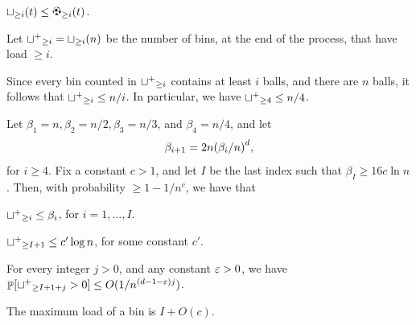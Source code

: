 \begin{observation}
    $\binsY{i}{t} \leq \ballsY{i}{t}$.
\end{observation}

\newcommand{\BadEvent}{\mathcal{B}}%
\newcommand{\GoodEvent}{\mathcal{G}}%


Let $\BLX{i} = \binsY{i}{n}$ be the number of bins, at the end of the
process, that have load $\geq i$.

\begin{observation}
    Since every bin counted in ${{\sqcup^+{}}_{\geq i}}$ contains at least $i$ balls,
    and there are $n$ balls, it follows that ${{\sqcup^+{}}_{\geq i}} \leq n/i$.  In
    particular, we have ${{\sqcup^+{}}_{\geq 4}} \leq n/4$.
\end{observation}


\begin{lemma}
    Let $\beta_1 = n, \beta_2 = n/2, \beta_3=n/3$, and
    $\beta_4 = n/4$, and let
    \begin{equation*}
        \beta_{i+1} = 2 n \pth{\beta_i/n}^d,
    \end{equation*}
    for $i\geq 4$.  Fix a constant $c > 1$, and let $I$ be the last index
    such that $\beta_{I} \geq 16c\ln n$. Then, with probability
    $\geq 1-1/n^c$, we have that
    \begin{compactenumA}
        \smallskip%
        \item ${{\sqcup^+{}}_{\geq i}} \leq \beta_i$, for $i=1,\ldots, I$.
        \smallskip%
        \item ${{\sqcup^+{}}_{\geq I+1}} \leq c' \log n$, for some constant $c'$. %

        \smallskip%
        \item For every integer $j > 0$, and any constant ${\varepsilon} > 0$, we
        have $\Prob{ \BLX{I+1+j} > 0} \leq O(1/n^{(d-1-\eps)j})$.

        \smallskip%
        \item The maximum load of a bin is $I+O(c)$.
    \end{compactenumA}
\end{lemma}

